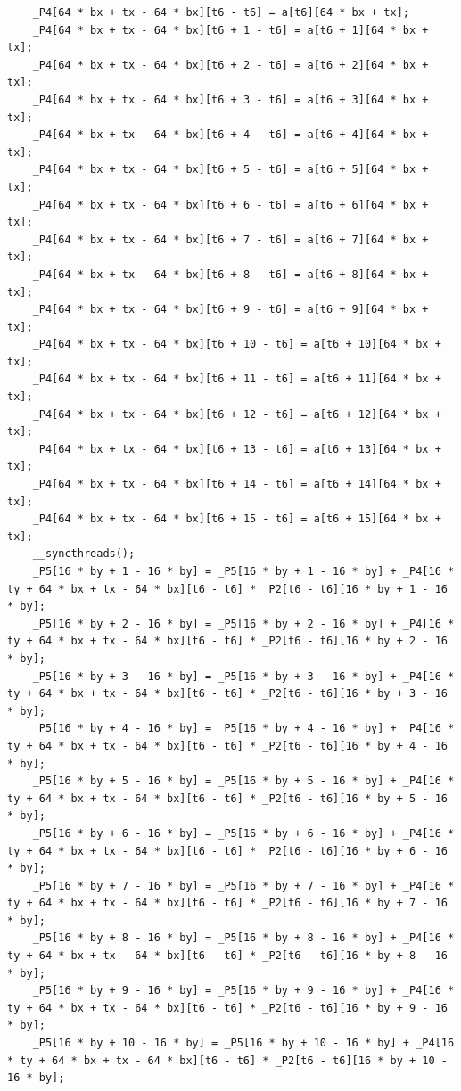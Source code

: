 \documentclass[msthesis,justified,copyright,final,numbers,sort&compress,
gsmodern,amstex,natbib]{uothesis}
\begin{document}
\begin{lstlisting}
    _P4[64 * bx + tx - 64 * bx][t6 - t6] = a[t6][64 * bx + tx];
    _P4[64 * bx + tx - 64 * bx][t6 + 1 - t6] = a[t6 + 1][64 * bx + tx];
    _P4[64 * bx + tx - 64 * bx][t6 + 2 - t6] = a[t6 + 2][64 * bx + tx];
    _P4[64 * bx + tx - 64 * bx][t6 + 3 - t6] = a[t6 + 3][64 * bx + tx];
    _P4[64 * bx + tx - 64 * bx][t6 + 4 - t6] = a[t6 + 4][64 * bx + tx];
    _P4[64 * bx + tx - 64 * bx][t6 + 5 - t6] = a[t6 + 5][64 * bx + tx];
    _P4[64 * bx + tx - 64 * bx][t6 + 6 - t6] = a[t6 + 6][64 * bx + tx];
    _P4[64 * bx + tx - 64 * bx][t6 + 7 - t6] = a[t6 + 7][64 * bx + tx];
    _P4[64 * bx + tx - 64 * bx][t6 + 8 - t6] = a[t6 + 8][64 * bx + tx];
    _P4[64 * bx + tx - 64 * bx][t6 + 9 - t6] = a[t6 + 9][64 * bx + tx];
    _P4[64 * bx + tx - 64 * bx][t6 + 10 - t6] = a[t6 + 10][64 * bx + tx];
    _P4[64 * bx + tx - 64 * bx][t6 + 11 - t6] = a[t6 + 11][64 * bx + tx];
    _P4[64 * bx + tx - 64 * bx][t6 + 12 - t6] = a[t6 + 12][64 * bx + tx];
    _P4[64 * bx + tx - 64 * bx][t6 + 13 - t6] = a[t6 + 13][64 * bx + tx];
    _P4[64 * bx + tx - 64 * bx][t6 + 14 - t6] = a[t6 + 14][64 * bx + tx];
    _P4[64 * bx + tx - 64 * bx][t6 + 15 - t6] = a[t6 + 15][64 * bx + tx];
    __syncthreads();
    _P5[16 * by + 1 - 16 * by] = _P5[16 * by + 1 - 16 * by] + _P4[16 * ty + 64 * bx + tx - 64 * bx][t6 - t6] * _P2[t6 - t6][16 * by + 1 - 16 * by];
    _P5[16 * by + 2 - 16 * by] = _P5[16 * by + 2 - 16 * by] + _P4[16 * ty + 64 * bx + tx - 64 * bx][t6 - t6] * _P2[t6 - t6][16 * by + 2 - 16 * by];
    _P5[16 * by + 3 - 16 * by] = _P5[16 * by + 3 - 16 * by] + _P4[16 * ty + 64 * bx + tx - 64 * bx][t6 - t6] * _P2[t6 - t6][16 * by + 3 - 16 * by];
    _P5[16 * by + 4 - 16 * by] = _P5[16 * by + 4 - 16 * by] + _P4[16 * ty + 64 * bx + tx - 64 * bx][t6 - t6] * _P2[t6 - t6][16 * by + 4 - 16 * by];
    _P5[16 * by + 5 - 16 * by] = _P5[16 * by + 5 - 16 * by] + _P4[16 * ty + 64 * bx + tx - 64 * bx][t6 - t6] * _P2[t6 - t6][16 * by + 5 - 16 * by];
    _P5[16 * by + 6 - 16 * by] = _P5[16 * by + 6 - 16 * by] + _P4[16 * ty + 64 * bx + tx - 64 * bx][t6 - t6] * _P2[t6 - t6][16 * by + 6 - 16 * by];
    _P5[16 * by + 7 - 16 * by] = _P5[16 * by + 7 - 16 * by] + _P4[16 * ty + 64 * bx + tx - 64 * bx][t6 - t6] * _P2[t6 - t6][16 * by + 7 - 16 * by];
    _P5[16 * by + 8 - 16 * by] = _P5[16 * by + 8 - 16 * by] + _P4[16 * ty + 64 * bx + tx - 64 * bx][t6 - t6] * _P2[t6 - t6][16 * by + 8 - 16 * by];
    _P5[16 * by + 9 - 16 * by] = _P5[16 * by + 9 - 16 * by] + _P4[16 * ty + 64 * bx + tx - 64 * bx][t6 - t6] * _P2[t6 - t6][16 * by + 9 - 16 * by];
    _P5[16 * by + 10 - 16 * by] = _P5[16 * by + 10 - 16 * by] + _P4[16 * ty + 64 * bx + tx - 64 * bx][t6 - t6] * _P2[t6 - t6][16 * by + 10 - 16 * by];

\end{lstlisting}
\end{document}
